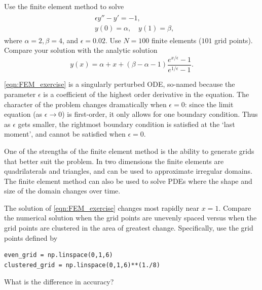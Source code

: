 \begin{problem}
Use the finite element method to solve
\begin{align}
	\begin{split}
	&{ }\epsilon y'' - y' = -1,\\
	&{ }y(0) = \alpha, \quad y(1) = \beta,
	\end{split} \label{eqn:FEM_exercise}
\end{align}
where $\alpha = 2, \beta = 4$, and $\epsilon = 0.02$.
Use $N = 100$ finite elements ($101$ grid points).
Compare your solution with the analytic solution
\[y(x) = \alpha + x + (\beta - \alpha - 1 ) \frac{e^{x/\epsilon} -1}{e^{1/\epsilon} -1}.\]

\eqref{eqn:FEM_exercise} is a singularly perturbed ODE, so-named because the parameter $\epsilon$ is a coefficient of the highest order derivative in the equation.
The character of the problem changes dramatically when $\epsilon = 0$: since the limit equation (as $\epsilon \to 0$) is first-order, it only allows for one boundary condition.
Thus as $\epsilon$ gets smaller, the rightmost boundary condition is satisfied at the `last moment',  and cannot be satisfied when $\epsilon = 0$.
\end{problem}

\begin{problem}
One of the strengths of the finite element method is the ability to generate grids that better suit the problem.
In two dimensions the finite elements are quadrilaterals and triangles, and can be used to approximate irregular domains.
The finite element method can also be used to solve PDEs where the shape and size of the domain changes over time.

The solution of \eqref{eqn:FEM_exercise} changes most rapidly near $x = 1$.
Compare the numerical solution when the grid points are unevenly spaced versus when the grid points are clustered in the area of greatest change. Specifically, use the grid points defined by
\begin{lstlisting}
even_grid = np.linspace(0,1,6)
clustered_grid = np.linspace(0,1,6)**(1./8)
\end{lstlisting}
What is the difference in accuracy?
\end{problem}


